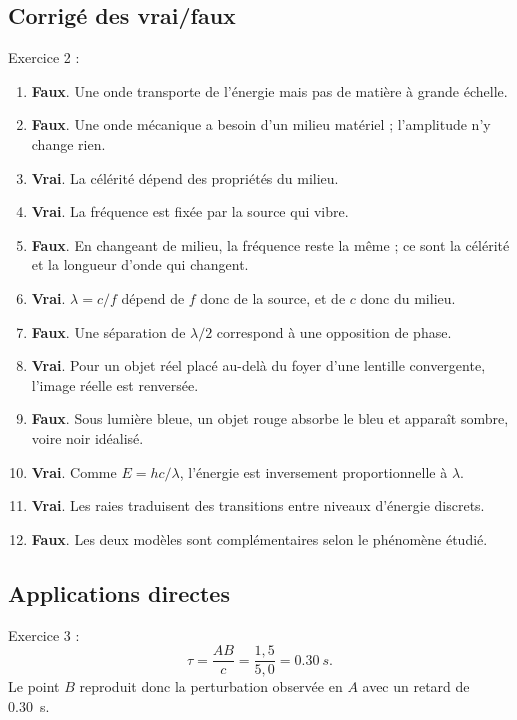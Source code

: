 \documentclass[11pt,a4paper]{article}
\newcommand{\vrai}{\textbf{Vrai}}
\newcommand{\faux}{\textbf{Faux}}
\begin{document}
\subsection*{Corrigé des vrai/faux}
\begin{corrbox}
Exercice 2 :
\begin{enumerate}[label=\arabic*.,leftmargin=0.8cm]
    \item \faux. Une onde transporte de l'énergie mais pas de matière à grande échelle.
    \item \faux. Une onde mécanique a besoin d'un milieu matériel ; l'amplitude n'y change rien.
    \item \vrai. La célérité dépend des propriétés du milieu.
    \item \vrai. La fréquence est fixée par la source qui vibre.
    \item \faux. En changeant de milieu, la fréquence reste la même ; ce sont la célérité et la longueur d'onde qui changent.
    \item \vrai. $\lambda=c/f$ dépend de $f$ donc de la source, et de $c$ donc du milieu.
    \item \faux. Une séparation de $\lambda/2$ correspond à une opposition de phase.
    \item \vrai. Pour un objet réel placé au-delà du foyer d'une lentille convergente, l'image réelle est renversée.
    \item \faux. Sous lumière bleue, un objet rouge absorbe le bleu et apparaît sombre, voire noir idéalisé.
    \item \vrai. Comme $E=hc/\lambda$, l'énergie est inversement proportionnelle à $\lambda$.
    \item \vrai. Les raies traduisent des transitions entre niveaux d'énergie discrets.
    \item \faux. Les deux modèles sont complémentaires selon le phénomène étudié.
\end{enumerate}
\end{corrbox}

\subsection*{Applications directes}
\begin{corrbox}
Exercice 3 :
\[
\tau=\frac{AB}{c}=\frac{1{,}5}{5{,}0}=\SI{0,30}{s}.
\]
Le point $B$ reproduit donc la perturbation observée en $A$ avec un retard de \SI{0,30}{s}.
\end{corrbox}
\end{document}
